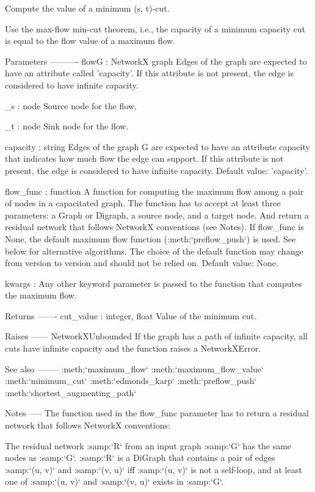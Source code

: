 \begin{DoxyVerb}Compute the value of a minimum (s, t)-cut.

Use the max-flow min-cut theorem, i.e., the capacity of a minimum
capacity cut is equal to the flow value of a maximum flow.

Parameters
----------
flowG : NetworkX graph
    Edges of the graph are expected to have an attribute called
    'capacity'. If this attribute is not present, the edge is
    considered to have infinite capacity.

_s : node
    Source node for the flow.

_t : node
    Sink node for the flow.

capacity : string
    Edges of the graph G are expected to have an attribute capacity
    that indicates how much flow the edge can support. If this
    attribute is not present, the edge is considered to have
    infinite capacity. Default value: 'capacity'.

flow_func : function
    A function for computing the maximum flow among a pair of nodes
    in a capacitated graph. The function has to accept at least three
    parameters: a Graph or Digraph, a source node, and a target node.
    And return a residual network that follows NetworkX conventions
    (see Notes). If flow_func is None, the default maximum
    flow function (:meth:`preflow_push`) is used. See below for
    alternative algorithms. The choice of the default function may change
    from version to version and should not be relied on. Default value:
    None.

kwargs : Any other keyword parameter is passed to the function that
    computes the maximum flow.

Returns
-------
cut_value : integer, float
    Value of the minimum cut.

Raises
------
NetworkXUnbounded
    If the graph has a path of infinite capacity, all cuts have
    infinite capacity and the function raises a NetworkXError.

See also
--------
:meth:`maximum_flow`
:meth:`maximum_flow_value`
:meth:`minimum_cut`
:meth:`edmonds_karp`
:meth:`preflow_push`
:meth:`shortest_augmenting_path`

Notes
-----
The function used in the flow_func parameter has to return a residual
network that follows NetworkX conventions:

The residual network :samp:`R` from an input graph :samp:`G` has the
same nodes as :samp:`G`. :samp:`R` is a DiGraph that contains a pair
of edges :samp:`(u, v)` and :samp:`(v, u)` iff :samp:`(u, v)` is not a
self-loop, and at least one of :samp:`(u, v)` and :samp:`(v, u)` exists
in :samp:`G`.


\end{DoxyVerb}
